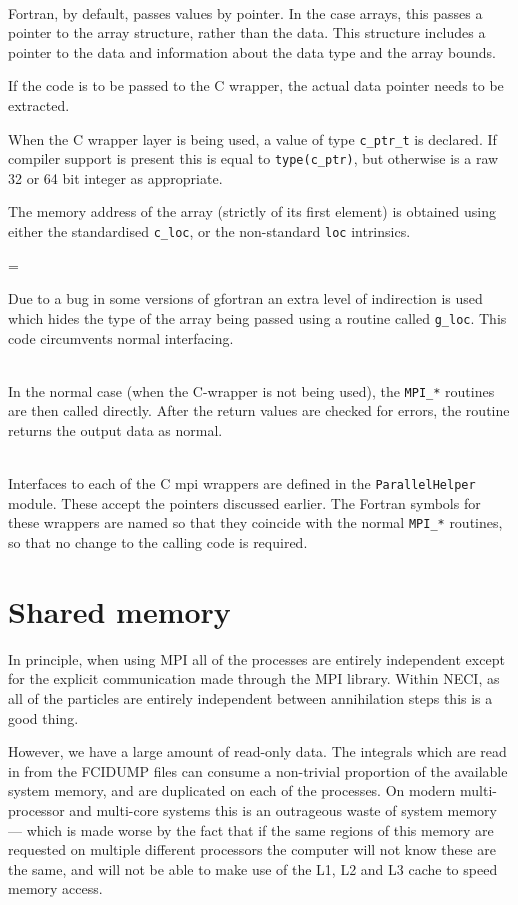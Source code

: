 \documentclass[a4paper,notitlepage,dvipsnames]{scrreprt}
\newcommand\headitem[1]{\needspace{1.5\baselineskip}\item[{\boldmath #1 \nopagebreak}] \hfill \\ \nopagebreak}
\let\code\lstinline
\newenvironment{warningbox}
	{\par\begin{mdframed}[%
		linewidth = 2pt, %
	    linecolor = red, %
	    roundcorner = 6pt, %
		backgroundcolor = gray!20
	]\begin{list}{}{\leftmargin=1cm
			           \labelwidth=\leftmargin}\item[\Large\ding{43}]}
	{\end{list}\end{mdframed}\par}
\begin{document}
{{{\begin{description}
		\headitem{Conversion to pointers}
			Fortran, by default, passes values by pointer. In the case
			arrays, this passes a pointer to the array structure, rather
			than the data. This structure includes a pointer to the data
			and information about the data type and the array bounds.

			If the code is to be passed to the C wrapper, the actual
			data pointer needs to be extracted.

			When the C wrapper layer is being used, a value of type
			\code{c_ptr_t} is declared. If compiler support is
			present this is equal to \code{type(c_ptr)}, but otherwise
			is a raw 32 or 64 bit integer as appropriate.

			The memory address of the array (strictly of its first
			element) is obtained using either the standardised
			\code{c_loc}, or the non-standard \code{loc}
			intrinsics.

			\begin{warningbox}
			Due to a bug in some versions of gfortran an
			extra level of indirection is used which hides the type
			of the array being passed using a routine called
			\code{g_loc}. This code circumvents normal interfacing.
			\end{warningbox}

		\headitem{Calls to MPI}
			In the normal case (when the C-wrapper is not being
			used), the \code{MPI_*} routines are then called directly.
			After the return values are checked for errors, the
			routine returns the output data as normal.

		\headitem{C wrapper layer}
			Interfaces to each of the C mpi wrappers are defined in
			the \code{ParallelHelper} module. These accept the
			pointers discussed earlier. The Fortran symbols for these
			wrappers are named so that they coincide with the normal
			\code{MPI_*} routines, so that no change to the calling
			code is required.

	\end{description}

\section{Shared memory}
	In principle, when using MPI all of the processes are entirely independent
	except for the explicit communication made through the MPI library. Within
	NECI, as all of the particles are entirely independent between annihilation
	steps this is a good thing.

	However, we have a large amount of read-only data. The integrals which are
	read in from the FCIDUMP files can consume a non-trivial proportion of the
	available system memory, and are duplicated on each of the processes. On
	modern multi-processor and multi-core systems this is an outrageous waste
	of system memory --- which is made worse by the fact that if the same
	regions of this memory are requested on multiple different processors the
	computer will not know these are the same, and will not be able to make use
	of the L1, L2 and L3 cache to speed memory access.

}}}
\end{document}
